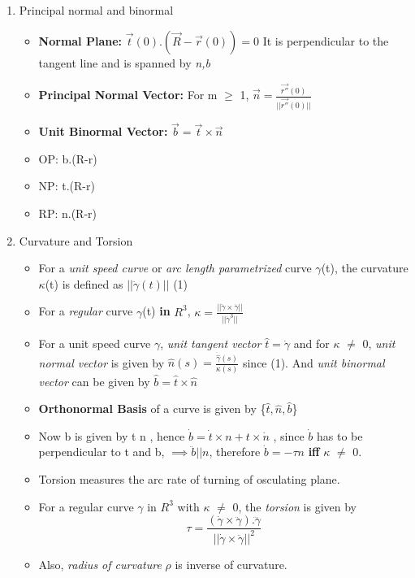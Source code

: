 \documentclass[11pt]{article}
\begin{document}
\begin{enumerate}
\item Principal normal and binormal
\label{sec:org31d27a3}
\begin{itemize}
\item \textbf{Normal Plane:} \(\vec{t}(0).(\vec{R}-\vec{r}(0)) = 0\)
It is perpendicular to the tangent line and is spanned by \emph{n,b}
\item \textbf{Principal Normal Vector:} For m \(\ge\) 1, \(\vec{n}=\frac{\vec{r''}(0)}{||\vec{r''}(0)||}\)
\item \textbf{Unit Binormal Vector:} \(\vec{b}=\vec{t}\times\vec{n}\)
\item OP: b.(R-r)
\item NP: t.(R-r)
\item RP: n.(R-r)
\end{itemize}
\item Curvature and Torsion
\label{sec:org6bb063d}
\begin{itemize}
\item For a \emph{unit speed curve} or \emph{arc length parametrized} curve \(\gamma\)(t), the curvature \(\kappa\)(t) is defined as \(||\ddot{\gamma}(t)||\) (1)
\item For a \emph{regular} curve \(\gamma\)(t) \textbf{in} \(R^{3}\), \(\kappa = \frac{||\ddot{\gamma}\times\dot{\gamma}||}{||\dot{\gamma}^{3}||}\)
\item For a unit speed curve \(\gamma\), \emph{unit tangent vector} \(\hat{t}=\dot{\gamma}\) and for \(\kappa\) \(\neq\) 0, \emph{unit normal vector} is given by  \(\hat{n}(s)=\frac{\dot{\hat{\gamma}}(s)}{\kappa(s)}\) since (1). And \emph{unit binormal vector} can be given by \(\hat{b}=\hat{t}\times\hat{n}\)
\item \textbf{Orthonormal Basis} of a curve is given by \{\(\hat{t},\hat{n},\hat{b}\)\}
\item Now b is given by t \texttimes{} n , hence \(\dot{b}=\dot{t}\times n+t\times\dot{n}\) , since \(\dot{b}\) has to be perpendicular to t and b, \(\implies \ddot{b}||n\), therefore \(\boxed{\dot{b}=-\tau n}\) \textbf{iff} \(\kappa\) \(\neq\) 0.
\item Torsion measures the arc rate of turning of osculating plane.
\item For a regular curve \(\gamma\) in \(R^{3}\) with \(\kappa\) \(\neq\) 0, the \emph{torsion} is given by
\[
  \tau = \frac{(\dot{\gamma}\times\ddot{\gamma}).\dddot{\gamma}}{||\dot{\gamma}\times\ddot{\gamma}||^{2}}
  \]
\item Also, \emph{radius of curvature} \(\rho\) is inverse of curvature.

\end{itemize}
\end{enumerate}
\end{document}
